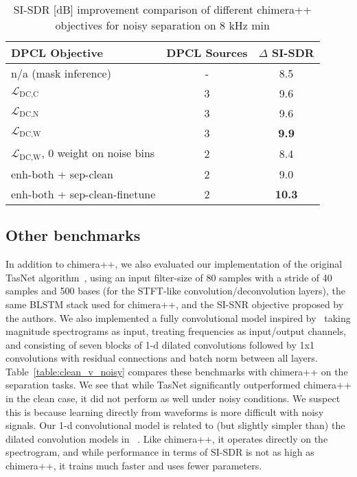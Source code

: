 \documentclass[a4paper]{article}
\begin{document}
\begin{table}[h]
    \footnotesize
    \caption{SI-SDR [dB] improvement comparison of different chimera++ objectives for noisy separation on 8 kHz min}\vspace{-0.5cm}
    \begin{center}
      \label{table:chimera_compare}
      \begin{tabular}{lcc}\hline
        DPCL Objective & DPCL Sources & $\Delta$ SI-SDR \\ \hline \hline
        n/a (mask inference) & - & \phantom{1}8.5  \\
        $\mathcal{L}_{\text{DC},\text{C}}$ & 3 & \phantom{1}9.6  \\
        $\mathcal{L}_{\text{DC},\text{N}}$ & 3 & \phantom{1}9.6  \\
        $\mathcal{L}_{\text{DC},\text{W}}$ & 3 & {\bf \phantom{1}9.9}  \\
        $\mathcal{L}_{\text{DC},\text{W}}$, 0 weight on noise bins & 2 & \phantom{1}8.4  \\ \hline
        enh-both + sep-clean & 2 & \phantom{1}9.0  \\
        enh-both + sep-clean-finetune & 2 & {\bf 10.3}  \\ \hline
      \end{tabular}
    \end{center}\vspace{-0.6cm}
  \end{table}
  
  
\subsection{Other benchmarks}
\label{sec:benchmarks}
In addition to chimera++, we also evaluated our implementation of the original TasNet algorithm~\cite{Luo2018}, using an input filter-size of 80 samples with a stride of 40 samples and 500 bases (for the STFT-like convolution/deconvolution layers), the same BLSTM stack used for chimera++, and the SI-SNR objective proposed by the authors.  We also implemented a fully convolutional model inspired by~\cite{LeaFVRH16} taking magnitude spectrograms as input, treating frequencies as input/output channels, and consisting of seven blocks of 1-d dilated convolutions followed by 1x1 convolutions with residual connections and batch norm between all layers.  Table~\ref{table:clean_v_noisy} compares these benchmarks with chimera++ on the separation tasks.  We see that while TasNet significantly outperformed chimera++ in the clean case, it did not perform as well under noisy conditions.  We suspect this is because learning directly from waveforms is more difficult with noisy signals.  Our 1-d convolutional model is related to (but slightly simpler than) the dilated convolution models in ~\cite{Luo2018TasNet09arXiv, shi2019furcanext}.  Like chimera++, it operates directly on the spectrogram, and while performance in terms of SI-SDR is not as high as chimera++, it trains much faster and uses fewer parameters.
  
\end{document}
